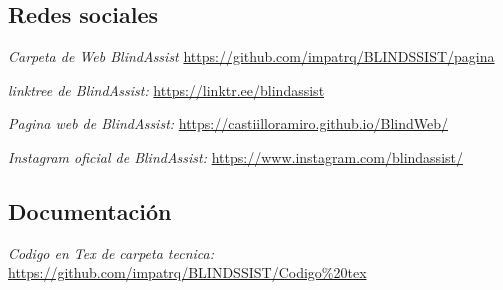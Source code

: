 \documentclass[12pt,a4paper]{article}
\begin{document}
\begin{thebibliography}{9}
\subsection{Redes sociales}
\emph{Carpeta de Web BlindAssist}
\href{https://github.com/impatrq/BLINDSSIST/tree/main/firmware/pagina%20web}{https://github.com/impatrq/BLINDSSIST/pagina}

\emph{linktree de BlindAssist:}
\href{https://linktr.ee/blindassist?fbclid=PAZXh0bgNhZW0CMTEAAaejZ-DVtX8PwclQCxtVIAFTMeQ2bF1__hJE3IXZvGlHDpwY1C9Xi3u7Qlj4Kg_aem_oKJ_WfNXSLX8A-x4wG293A}{https://linktr.ee/blindassist}

\emph{Pagina web de BlindAssist:}
\href{https://castiilloramiro.github.io/BlindWeb/}{https://castiilloramiro.github.io/BlindWeb/}

\emph{Instagram oficial de BlindAssist:}
\href{https://www.instagram.com/blindassist/}{https://www.instagram.com/blindassist/}

\subsection{Documentación}

\emph{Codigo en Tex de carpeta tecnica:}
\href{https://github.com/impatrq/BLINDSSIST/tree/main/docs/Codigo%20tex}{https://github.com/impatrq/BLINDSSIST/Codigo\%20tex}

\end{thebibliography}
\end{document}
